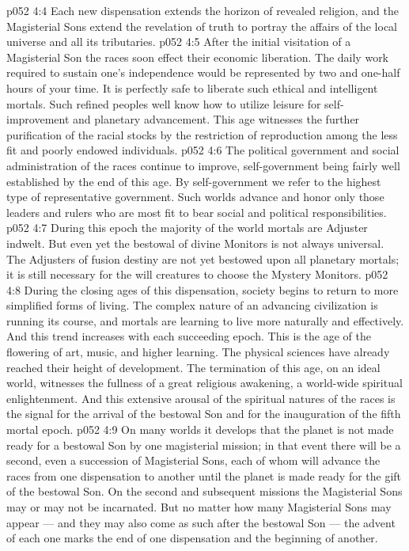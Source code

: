 \vs p052 4:4 Each new dispensation extends the horizon of revealed religion, and the Magisterial Sons extend the revelation of truth to portray the affairs of the local universe and all its tributaries.
\vs p052 4:5 \pc After the initial visitation of a Magisterial Son the races soon effect their economic liberation. The daily work required to sustain one’s independence would be represented by two and one\hyp{}half hours of your time. It is perfectly safe to liberate such ethical and intelligent mortals. Such refined peoples well know how to utilize leisure for self\hyp{}improvement and planetary advancement. This age witnesses the further purification of the racial stocks by the restriction of reproduction among the less fit and poorly endowed individuals.
\vs p052 4:6 The political government and social administration of the races continue to improve, self\hyp{}government being fairly well established by the end of this age. By self\hyp{}government we refer to the highest type of representative government. Such worlds advance and honor only those leaders and rulers who are most fit to bear social and political responsibilities.
\vs p052 4:7 During this epoch the majority of the world mortals are Adjuster indwelt. But even yet the bestowal of divine Monitors is not always universal. The Adjusters of fusion destiny are not yet bestowed upon all planetary mortals; it is still necessary for the will creatures to choose the Mystery Monitors.
\vs p052 4:8 During the closing ages of this dispensation, society begins to return to more simplified forms of living. The complex nature of an advancing civilization is running its course, and mortals are learning to live more naturally and effectively. And this trend increases with each succeeding epoch. This is the age of the flowering of art, music, and higher learning. The physical sciences have already reached their height of development. The termination of this age, on an ideal world, witnesses the fullness of a great religious awakening, a world\hyp{}wide spiritual enlightenment. And this extensive arousal of the spiritual natures of the races is the signal for the arrival of the bestowal Son and for the inauguration of the fifth mortal epoch.
\vs p052 4:9 \pc On many worlds it develops that the planet is not made ready for a bestowal Son by one magisterial mission; in that event there will be a second, even a succession of Magisterial Sons, each of whom will advance the races from one dispensation to another until the planet is made ready for the gift of the bestowal Son. On the second and subsequent missions the Magisterial Sons may or may not be incarnated. But no matter how many Magisterial Sons may appear --- and they may also come as such after the bestowal Son --- the advent of each one marks the end of one dispensation and the beginning of another.
